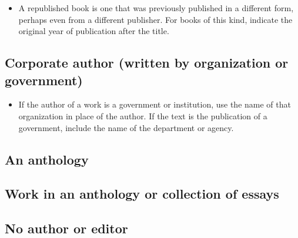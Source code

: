 {

\begin{itemize}\item A republished book is one that was previously published in a different form, perhaps even from a different publisher. For books of this kind, indicate the original year of publication after the title. \end{itemize}

\subsection{Corporate author (written by organization or government)}



\medskip 


\begin{itemize}\item If the author of a work is a government or institution, use the name of that organization in place of the author. If the text is the publication of a government, include the name of the department or agency. \end{itemize}

\subsection{An anthology}

\subsection{Work in an anthology or collection of essays}

\subsection{No author or editor}

}

